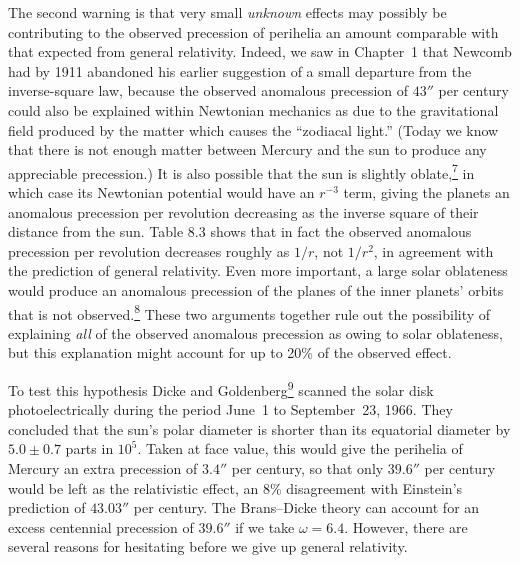 The second warning is that very small \emph{unknown} effects may possibly be
contributing to the observed precession of perihelia an amount comparable
with that expected from general relativity. Indeed, we saw in Chapter~1
that Newcomb had by 1911 abandoned his earlier suggestion of a small
departure from the inverse-square law, because the observed anomalous
precession of \(43''\) per century could also be explained within Newtonian
mechanics as due to the gravitational field produced by the matter which
causes the ``zodiacal light.'' (Today we know that there is not enough
matter between Mercury and the sun to produce any appreciable precession.)
It is also possible that the sun is slightly
oblate,\hyperref[ch8-ref-7]{\textsuperscript{7}} in which case its
Newtonian potential would have an \(r^{-3}\) term, giving the planets an
anomalous precession per revolution decreasing as the inverse square of
their distance from the sun.
Table 8.3 shows that in fact the observed anomalous precession per
revolution decreases roughly as \(1/r\), not \(1/r^2\), in agreement with
the prediction of general relativity. Even more important, a large solar
oblateness would produce an anomalous precession of the planes of the inner
planets' orbits that is not
observed.\hyperref[ch8-ref-8]{\textsuperscript{8}} These two arguments
together rule out the possibility of explaining \emph{all} of the observed
anomalous precession as owing to solar oblateness, but this explanation
might account for up to 20\% of the observed effect.

To test this hypothesis Dicke and
Goldenberg\hyperref[ch8-ref-9]{\textsuperscript{9}} scanned the solar disk
photoelectrically during the period June~1 to September~23, 1966. They
concluded that the sun's polar diameter is shorter than its equatorial
diameter by \(5.0\pm0.7\) parts in \(10^5\). Taken at face value, this
would give the perihelia of Mercury an extra precession of \(3.4''\) per
century, so that only \(39.6''\) per century would be left as the
relativistic effect, an 8\% disagreement with Einstein's prediction of
\(43.03''\) per century. The Brans--Dicke theory can account for an excess
centennial precession of \(39.6''\) if we take \(\omega=6.4\). However,
there are several reasons for hesitating before we give up general
relativity.

